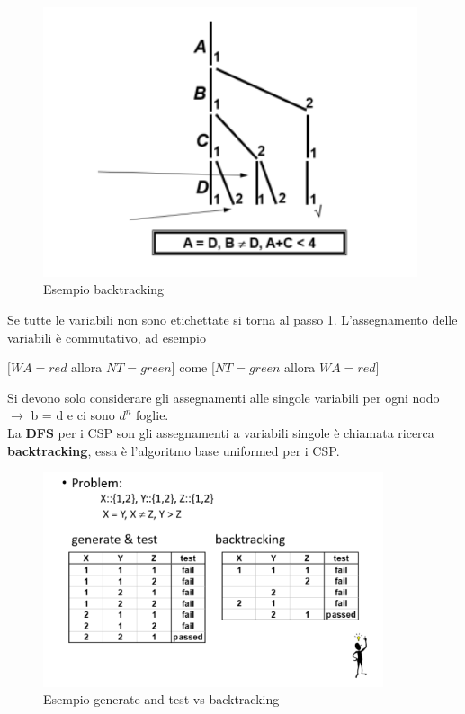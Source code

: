\begin{figure}[H]
    \centering
    \includegraphics[width=11cm, keepaspectratio]{img/Cap2/back1.png}
    \caption{Esempio backtracking}
\end{figure}

Se tutte le variabili non sono etichettate si torna al passo 1. L'assegnamento
delle variabili è commutativo, ad esempio
\begin{center}
    $[WA = red$ allora $NT = green]$ come [$NT=green$ allora $WA =red]$
\end{center}


Si devono solo considerare gli assegnamenti alle singole variabili per ogni nodo
$\rightarrow$ b = d e ci sono $d^n$ foglie. \\La \textbf{DFS} per i CSP son gli
assegnamenti a variabili singole è chiamata ricerca \textbf{backtracking}, essa
è l'algoritmo base uniformed per i CSP.

\begin{figure}[H]
    \centering
    \includegraphics[width=10cm, keepaspectratio]{img/Cap2/back2.png}
    \caption{Esempio generate and test vs backtracking}
\end{figure}

